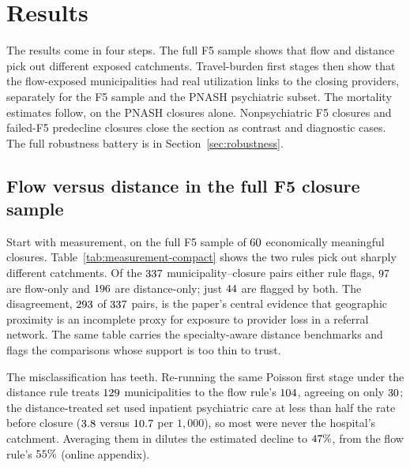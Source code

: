 \section{Results}
\label{sec:results}

The results come in four steps. The full F5 sample shows that flow and
distance pick out different exposed catchments. Travel-burden first stages
then show that the flow-exposed municipalities had real utilization links
to the closing providers, separately for the F5 sample and the PNASH
psychiatric subset. The mortality estimates follow, on the PNASH closures
alone. Nonpsychiatric F5 closures and failed-F5 predecline closures close
the section as contrast and diagnostic cases. The full robustness battery
is in Section~\ref{sec:robustness}.

\subsection{Flow versus distance in the full F5 closure sample}
\label{sec:results-f5-measurement}

Start with measurement, on the full F5 sample of $60$
economically meaningful closures. Table~\ref{tab:measurement-compact}
shows the two rules pick out sharply different catchments. Of the
$337$ municipality--closure pairs either rule flags,
$97$ are flow-only and $196$ are distance-only; just
$44$ are flagged by both. The disagreement, $293$ of
$337$ pairs, is the paper's central evidence that geographic
proximity is an incomplete proxy for exposure to provider loss in a
referral network. The same table carries the specialty-aware distance
benchmarks and flags the comparisons whose support is too thin to trust.

The misclassification has teeth. Re-running the same Poisson first stage
under the distance rule treats $129$ municipalities to the flow
rule's $104$, agreeing on only $30$; the distance-treated
set used inpatient psychiatric care at less than half the rate before closure
($3.8$ versus $10.7$ per $1{,}000$), so most were never
the hospital's catchment. Averaging them in dilutes the estimated decline to
$47\%$, from the flow rule's $55\%$ (online appendix).

